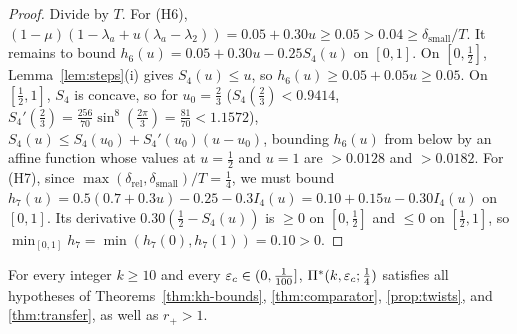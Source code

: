 \begin{proof}
Divide by $T$. For (H6), $(1-\mu)(1-\lambda_a+u(\lambda_a-\lambda_2))=0.05+0.30u\ge0.05>0.04\ge\delta_{\mathrm{small}}/T$.
It remains to bound $h_6(u)=0.05+0.30u-0.25S_4(u)$ on $[0,1]$. On $[0,\frac12]$, Lemma~\ref{lem:steps}(i) gives
$S_4(u)\le u$, so $h_6(u)\ge0.05+0.05u\ge0.05$. On $[\frac12,1]$, $S_4$ is concave, so for $u_0=\frac23$
($S_4(\frac23)<0.9414$, $S_4'(\frac23)=\frac{256}{70}\sin^8(\frac{2\pi}{3})=\frac{81}{70}<1.1572$),
$S_4(u)\le S_4(u_0)+S_4'(u_0)(u-u_0)$, bounding $h_6(u)$ from below by an affine function whose values at $u=\frac12$
and $u=1$ are $>0.0128$ and $>0.0182$.
For (H7), since $\max(\delta_{\mathrm{rel}},\delta_{\mathrm{small}})/T=\frac14$, we must bound
$h_7(u)=0.5(0.7+0.3u)-0.25-0.3I_4(u)=0.10+0.15u-0.30I_4(u)$ on $[0,1]$. Its derivative $0.30(\frac12-S_4(u))$ is
$\ge0$ on $[0,\frac12]$ and $\le0$ on $[\frac12,1]$, so $\min_{[0,1]}h_7=\min(h_7(0),h_7(1))=0.10>0$.
\end{proof}

\begin{proposition}\label{prop:all-hyps}
For every integer $k\ge10$ and every $\varepsilon_c\in(0,\frac1{100}]$, $\Pi^*(k,\varepsilon_c;\frac14)$ satisfies all hypotheses of
Theorems~\ref{thm:kh-bounds}, \ref{thm:comparator}, \ref{prop:twists}, and \ref{thm:transfer}, as well as $r_+>1$.
\end{proposition}


